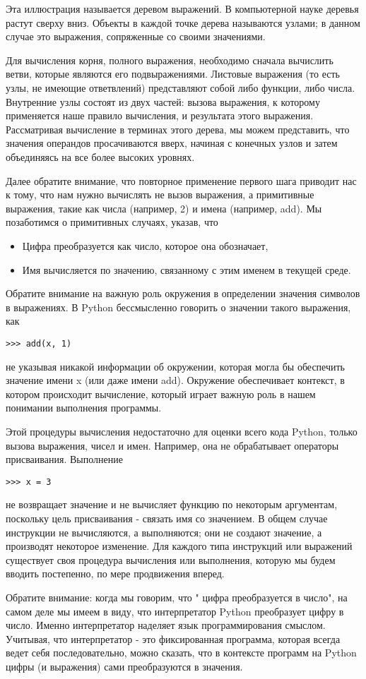 Эта иллюстрация называется деревом выражений. В компьютерной науке деревья растут сверху вниз. Объекты в каждой точке дерева называются узлами; в данном случае это выражения, сопряженные со своими значениями.

Для вычисления корня, полного выражения, необходимо сначала вычислить ветви, которые являются его подвыражениями. Листовые выражения (то есть узлы, не имеющие ответвлений) представляют собой либо функции, либо числа. Внутренние узлы состоят из двух частей: вызова выражения, к которому применяется наше правило вычисления, и результата этого выражения. Рассматривая вычисление в терминах этого дерева, мы можем представить, что значения операндов просачиваются вверх, начиная с конечных узлов и затем объединяясь на все более высоких уровнях.

Далее обратите внимание, что повторное применение первого шага приводит нас к тому, что нам нужно вычислять не вызов выражения, а примитивные выражения, такие как числа (например, 2) и имена (например, add). Мы позаботимся о примитивных случаях, указав, что
\begin{itemize}
  \item Цифра преобразуется как число, которое она обозначает,
  \item Имя вычисляется по значению, связанному с этим именем в текущей среде.
\end{itemize}

Обратите внимание на важную роль окружения в определении значения символов в выражениях. В Python бессмысленно говорить о значении такого выражения, как
\begin{verbatim}
>>> add(x, 1)
\end{verbatim}

не указывая никакой информации об окружении, которая могла бы обеспечить значение имени x (или даже имени add). Окружение обеспечивает контекст, в котором происходит вычисление, который играет важную роль в нашем понимании выполнения программы.

Этой процедуры вычисления недостаточно для оценки всего кода Python, только вызова выражения, чисел и имен. Например, она не обрабатывает операторы присваивания. Выполнение
\begin{verbatim}
>>> x = 3
\end{verbatim}

не возвращает значение и не вычисляет функцию по некоторым аргументам, поскольку цель присваивания - связать имя со значением. В общем случае инструкции не вычисляются, а выполняются; они не создают значение, а производят некоторое изменение. Для каждого типа инструкций или выражений существует своя процедура вычисления или выполнения, которую мы будем вводить постепенно, по мере продвижения вперед.

Обратите внимание: когда мы говорим, что " цифра преобразуется в число", на самом деле мы имеем в виду, что интерпретатор Python преобразует цифру в число. Именно интерпретатор наделяет язык программирования смыслом. Учитывая, что интерпретатор - это фиксированная программа, которая всегда ведет себя последовательно, можно сказать, что в контексте программ на Python цифры (и выражения) сами преобразуются в значения.

